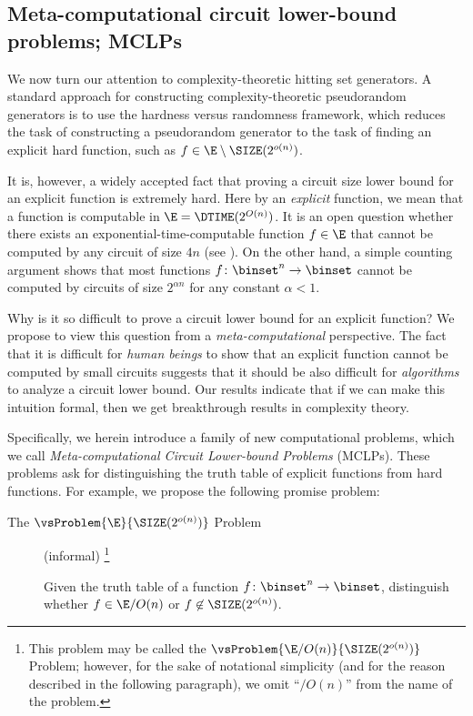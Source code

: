 \documentclass[11pt]{article}
\numberwithin{equation}{section}
\theoremstyle{definition}
\theoremstyle{plain}
\begin{document}
%
\subsection{Meta-computational circuit lower-bound problems; MCLPs}
\label{section_ComplexityHSG}

We now turn our attention to complexity-theoretic hitting set generators.
A standard approach for constructing complexity-theoretic pseudorandom generators
is to use the hardness versus randomness framework,
which reduces the task of constructing
a pseudorandom generator
to the task of finding an explicit hard function, such as $f \in \E \setminus \SIZE(2^{o(n)})$.

It is, however, a widely accepted fact that
proving a circuit size lower bound for an explicit function is extremely hard.
Here by an \emph{explicit} function, we mean that a function is computable in $\E = \DTIME(2^{O(n)})$.
It is an open question
whether there exists an exponential-time-computable function $f \in \E$
that cannot be computed by any circuit of size $4 n$
%
(see \cite{FindGHK16_focs_conf}).  %
On the other hand, a simple counting argument
shows that
most functions $f \colon \binset^n \to \binset$
cannot be computed by circuits of size $2^{\alpha n}$ for any constant $\alpha < 1$.

Why is it so difficult to prove a circuit lower bound for an explicit function?
We propose to view this question from a \emph{meta-computational} perspective.
The fact that it is difficult for \emph{human beings} to show that an explicit function
cannot be computed by small circuits
suggests
that
it should be also difficult for \emph{algorithms} to analyze a circuit lower bound.
Our results indicate that
if we can make this intuition formal, then we get breakthrough results in complexity theory.

Specifically,
we herein introduce a family of new computational problems,
which we call \emph{Meta-computational Circuit Lower-bound Problems} (MCLPs).
These problems ask for distinguishing the truth table of explicit functions
from hard functions.
For example, we propose the following promise problem:
\begin{description}
  \item
        [The $\vsProblem{\E}{\SIZE(2^{o(n)})}$ Problem] (informal)%
        \footnote{This problem may be called the $\vsProblem{\E/O(n)}{\SIZE(2^{o(n)})}$ Problem; however, for the sake of notational simplicity (and for the reason described in the following paragraph), we omit ``$/O(n)$'' from the name of the problem.}
        \hspace{0em}

        Given the truth table of a function $f \colon \binset^n \to \binset$,
        distinguish whether
        $f \in \E / O(n)$
        or
        $f \not\in \SIZE(2^{o(n)})$.
\end{description}
\end{document}
